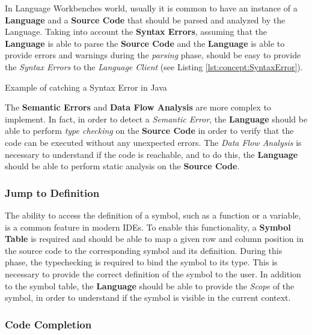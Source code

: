 In Language Workbenches world, usually it is common to have an instance of a \textbf{Language} and a \textbf{Source Code} that should be parsed and analyzed by the Language.
Taking into account the \textbf{Syntax Errors}, assuming that the \textbf{Language} is able to parse the \textbf{Source Code} and the \textbf{Language} is able to provide errors and warnings during the \textit{parsing} phase, should be easy to provide the \textit{Syntax Errors} to the \textit{Language Client} (see Listing \ref{lst:concept:SyntaxError}).

\begin{Listing}[t]
    \centering
    \caption{Example of catching a Syntax Error in Java}
    \label{lst:concept:SyntaxError}
\end{Listing}

The \textbf{Semantic Errors} and \textbf{Data Flow Analysis} are more complex to implement. In fact, in order to detect a \textit{Semantic Error}, the \textbf{Language} should be able to perform \textit{type checking} on the \textbf{Source Code} in order to verify that the code can be executed without any unexpected errors. The \textit{Data Flow Analysis} is necessary to understand if the code is reachable, and to do this, the \textbf{Language} should be able to perform static analysis on the \textbf{Source Code}.

\subsubsection{Jump to Definition}\label{subsubsec:concept:JumpToDefinition}
The ability to access the definition of a symbol, such as a function or a variable, is a common feature in modern IDEs.
To enable this functionality, a \textbf{Symbol Table} is required and should be able to map a given row and column position in the source code to the corresponding symbol and its definition.
During this phase, the typechecking is required to bind the symbol to its type. This is necessary to provide the correct definition of the symbol to the user.
In addition to the symbol table, the \textbf{Language} should be able to provide the \textit{Scope} of the symbol, in order to understand if the symbol is visible in the current context.

\subsubsection{Code Completion}\label{subsubsec:concept:CodeCompletion}

